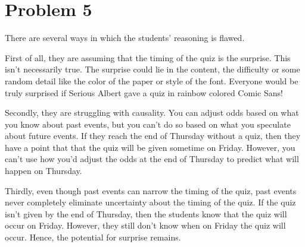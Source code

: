 \documentclass{article}
\begin{document}
\pagebreak

\section{Problem 5}
There are several ways in which the students' reasoning is flawed.

First of all, they are assuming that the timing of the quiz is the surprise. This isn't necessarily true. The surprise could lie in the content, the difficulty or some random detail like the color of the paper or style of the font. Everyone would be truly surprised if Serious Albert gave a quiz in rainbow colored Comic Sans!

Secondly, they are struggling with causality. You can adjust odds based on what you know about past events, but you can't do so based on what you speculate about future events.  If they reach the end of Thursday without a quiz, then they have a point that that the quiz will be given sometime on Friday. However, you can't use how you'd adjust the odds at the end of Thursday to predict what will happen on Thursday.

Thirdly, even though past events can narrow the timing of the quiz, past events never completely eliminate uncertainty about the timing of the quiz. If the quiz isn't given by the end of Thursday, then the students know that the quiz will occur on Friday. However, they still don't know when on Friday the quiz will occur. Hence, the potential for surprise remains.
\end{document}

